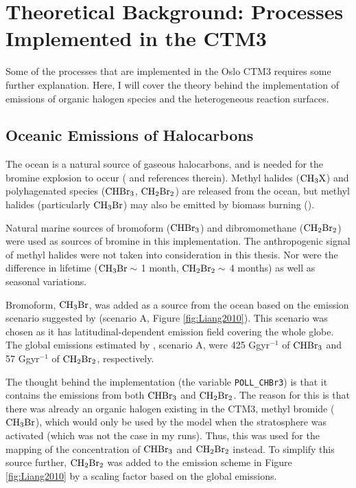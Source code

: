 \setcounter{chapter}{2} 
\chapter{Theoretical Background: Processes Implemented in the CTM3}\label{Chap:CTM3theory_ocean_hetReact}

Some of the processes that are implemented in the Oslo CTM3 requires some further explanation. Here, I will cover the theory behind the implementation of emissions of organic halogen species and the heterogeneous reaction surfaces.

\section{Oceanic Emissions of Halocarbons}\label{sec:oceanic_emissions}


The ocean is a natural source of gaseous halocarbons, and is needed for the bromine explosion to occur (\cite{Schmidt} and references therein). Methyl halides ($\mathrm{CH_3X}$) and polyhagenated species ($\mathrm{CHBr_3}$, $\mathrm{CH_2Br_2}$) are released from the ocean, but methyl halides (particularly $\mathrm{CH_3Br}$) may also be emitted by biomass burning (\cite{SeinfeldSpyros}). 



\medskip

Natural marine sources of bromoform ($\mathrm{CHBr_3}$) and dibromomethane ($\mathrm{CH_2Br_2}$) were used as sources of bromine in this implementation. The anthropogenic signal of methyl halides were not taken into consideration in this thesis. Nor were the difference in lifetime ($\mathrm{CH_3Br} \sim$ 1 month, $\mathrm{CH_2Br_2} \sim$ 4 months) as well as seasonal variations. 


\medskip

Bromoform, $\mathrm{CH_3Br}$, was added as a source from the ocean based on the emission scenario suggested by \cite{Liang2010} (scenario A, Figure \ref{fig:Liang2010}). This scenario was chosen as it has latitudinal-dependent emission field covering the whole globe. The global emissions estimated by \cite{Liang2010}, scenario A, were 425 Ggyr$^{-1}$ of $\mathrm{CHBr_3}$ and 57 Ggyr$^{-1}$ of $\mathrm{CH_2Br_2}$, respectively.

\medskip

The thought behind the implementation (the variable \texttt{POLL\_CHBr3}) is that it contains the emissions from both $\mathrm{CHBr_3}$ and $\mathrm{CH_2Br_2}$. The reason for this is that there was already an organic halogen existing in the CTM3, methyl bromide ($\mathrm{CH_3Br}$), which would only be used by the model when the stratosphere was activated (which was not the case in my runs). Thus, this was used for the mapping of the concentration of $\mathrm{CHBr_3}$ and $\mathrm{CH_2Br_2}$ instead. To simplify this source further, $\mathrm{CH_2Br_2}$ was added to the emission scheme in Figure \ref{fig:Liang2010} by a scaling factor based on the global emissions. 

